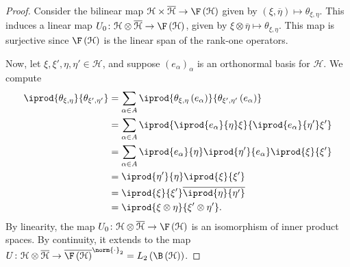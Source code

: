 \documentclass[10pt]{mypackage}
\begin{document}
\begin{proof}
  Consider the bilinear map $\mathcal{H}\times \overline{\mathcal{H}} \rightarrow \F\left( \mathcal{H} \right)$ given by $\left( \xi,\overline{\eta} \right) \mapsto \theta_{\xi,\eta}$. This induces a linear map $U_0\colon \mathcal{H}\otimes \overline{\mathcal{H}} \rightarrow \F\left( \mathcal{H} \right)$, given by $\xi\otimes \overline{\eta} \mapsto \theta_{\xi,\eta}$. This map is surjective since $\F\left( \mathcal{H} \right)$ is the linear span of the rank-one operators.\newline

  Now, let $\xi,\xi',\eta,\eta'\in \mathcal{H}$, and suppose $\left( e_{\alpha} \right)_{\alpha}$ is an orthonormal basis for $\mathcal{H}$. We compute
  \begin{align*}
    \iprod{\theta_{\xi,\eta}}{\theta_{\xi',\eta'}} &= \sum_{\alpha \in A} \iprod{\theta_{\xi,\eta}\left( e_{\alpha} \right)}{\theta_{\xi',\eta'}\left( e_{\alpha} \right)}\\
                                                   &= \sum_{\alpha\in A} \iprod{ \iprod{e_{\alpha}}{\eta}\xi }{ \iprod{e_{\alpha}}{\eta'}\xi' }\\
                                                   &= \sum_{\alpha \in A} \iprod{e_{\alpha}}{\eta} \iprod{\eta'}{e_{\alpha}} \iprod{\xi}{\xi'}\\
                                                   &= \iprod{\eta'}{\eta} \iprod{\xi}{\xi'}\\
                                                   &= \iprod{\xi}{\xi'} \overline{ \iprod{\eta}{\eta'} }\\
                                                   &= \iprod{ \xi\otimes\eta }{\xi'\otimes\eta'}.
  \end{align*}
  By linearity, the map $U_0\colon \mathcal{H}\otimes \overline{\mathcal{H}} \rightarrow \F\left( \mathcal{H} \right)$ is an isomorphism of inner product spaces. By continuity, it extends to the map $U\colon \mathcal{H}\otimes \overline{\mathcal{H}} \rightarrow \overline{\F\left( \mathcal{H} \right)}^{\norm{\cdot}_2} = L_2\left( \B\left( \mathcal{H} \right) \right)$.
\end{proof}
\end{document}

